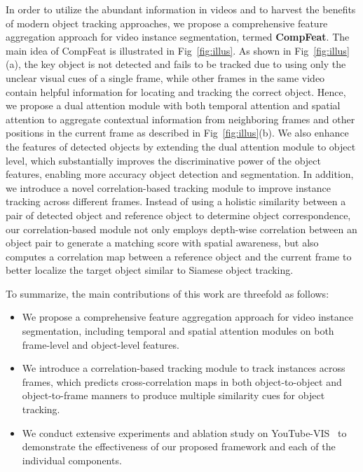 \documentclass[letterpaper]{article} \usepackage{aaai21}  \usepackage{times}  \usepackage{helvet} \usepackage{courier}  \usepackage[hyphens]{url}  \usepackage{graphicx} \urlstyle{rm} \def\UrlFont{\rm}  \usepackage{natbib}  \usepackage{caption} \frenchspacing  \setlength{\pdfpagewidth}{8.5in}  \setlength{\pdfpageheight}{11in}  \newcommand{\etal}{\emph{et al. }}
\begin{document}
In order to utilize the abundant information in videos and to harvest the benefits of modern object tracking approaches, we propose a comprehensive feature aggregation approach for video instance segmentation, termed \textbf{CompFeat}. The main idea of CompFeat is illustrated in Fig~\ref{fig:illus}.  
As shown in Fig~\ref{fig:illus}(a), the key object is not detected and fails to be tracked due to using only the unclear visual cues of a single frame, while other frames in the same video contain helpful information for locating and tracking the correct object. 
Hence, we propose a dual attention module with both temporal attention and spatial attention to aggregate contextual information from neighboring frames and other positions in the current frame as described in Fig~\ref{fig:illus}(b). 
We also enhance the features of detected objects by extending the dual attention module to object level, which substantially improves the discriminative power of the object features, enabling more accuracy object detection and segmentation. 
In addition, we introduce a novel correlation-based tracking module to improve instance tracking across different frames. Instead of using a holistic similarity between a pair of detected object and reference object to determine object correspondence, our correlation-based module not only employs depth-wise correlation between an object pair to generate a matching score with spatial awareness, but also computes a correlation map between a reference object and the current frame to better localize the target object similar to Siamese object tracking.

To summarize, the main contributions of this work are threefold as follows:
\begin{itemize}
\item We propose a comprehensive feature aggregation approach for video instance segmentation, including temporal and spatial attention modules on both frame-level and object-level features.
\item We introduce a correlation-based tracking module to track instances across frames, which predicts cross-correlation maps in both object-to-object and object-to-frame manners to produce multiple similarity cues for object tracking.
\item We conduct extensive experiments and ablation study on YouTube-VIS~\cite{yang2019video} to demonstrate the effectiveness of our proposed framework and each of the individual components.
\end{itemize}
\end{document}
